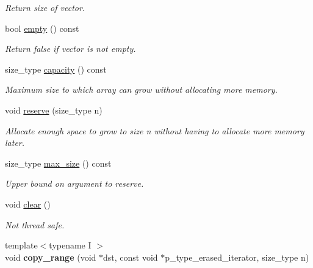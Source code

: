 \begin{DoxyCompactItemize}
\begin{DoxyCompactList}\small\item\em Return size of vector. \end{DoxyCompactList}\item 
\hypertarget{classtbb_1_1concurrent__vector_a3747f2cbd9fc6033f34a6fc8ef6b932b}{}bool \hyperlink{classtbb_1_1concurrent__vector_a3747f2cbd9fc6033f34a6fc8ef6b932b}{empty} () const \label{classtbb_1_1concurrent__vector_a3747f2cbd9fc6033f34a6fc8ef6b932b}

\begin{DoxyCompactList}\small\item\em Return false if vector is not empty. \end{DoxyCompactList}\item 
\hypertarget{classtbb_1_1concurrent__vector_ac0d13882cdbc4d838b383979749cd2f6}{}size\+\_\+type \hyperlink{classtbb_1_1concurrent__vector_ac0d13882cdbc4d838b383979749cd2f6}{capacity} () const \label{classtbb_1_1concurrent__vector_ac0d13882cdbc4d838b383979749cd2f6}

\begin{DoxyCompactList}\small\item\em Maximum size to which array can grow without allocating more memory. \end{DoxyCompactList}\item 
void \hyperlink{classtbb_1_1concurrent__vector_a24af110c649d48c1edaa3a55b2063bbd}{reserve} (size\+\_\+type n)
\begin{DoxyCompactList}\small\item\em Allocate enough space to grow to size n without having to allocate more memory later. \end{DoxyCompactList}\item 
\hypertarget{classtbb_1_1concurrent__vector_acca0f16367501f4c51981abfaeda7c0b}{}size\+\_\+type \hyperlink{classtbb_1_1concurrent__vector_acca0f16367501f4c51981abfaeda7c0b}{max\+\_\+size} () const \label{classtbb_1_1concurrent__vector_acca0f16367501f4c51981abfaeda7c0b}

\begin{DoxyCompactList}\small\item\em Upper bound on argument to reserve. \end{DoxyCompactList}\item 
void \hyperlink{classtbb_1_1concurrent__vector_a1f3916a3e461f24710bb87ce40debf1c}{clear} ()
\begin{DoxyCompactList}\small\item\em Not thread safe. \end{DoxyCompactList}\item 
\hypertarget{classtbb_1_1concurrent__vector_a1e708880f8da676ffa8c6fb199723f01}{}{\footnotesize template$<$typename I $>$ }\\void {\bfseries copy\+\_\+range} (void $\ast$dst, const void $\ast$p\+\_\+type\+\_\+erased\+\_\+iterator, size\+\_\+type n)\label{classtbb_1_1concurrent__vector_a1e708880f8da676ffa8c6fb199723f01}

\end{DoxyCompactItemize}

